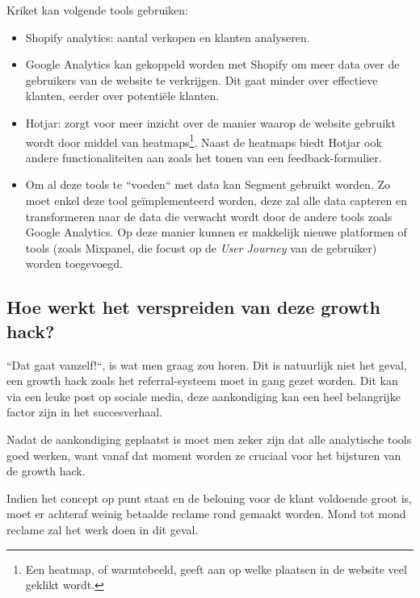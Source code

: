 Kriket kan volgende tools gebruiken:
\begin{itemize}
	\item Shopify analytics: aantal verkopen en klanten analyseren.
	\item Google Analytics kan gekoppeld worden met Shopify om meer data over de gebruikers van de website te verkrijgen. Dit gaat minder over effectieve klanten, eerder over potentiële klanten.
	\item Hotjar: zorgt voor meer inzicht over de manier waarop de website gebruikt wordt door middel van heatmaps\footnote{Een heatmap, of warmtebeeld, geeft aan op welke plaatsen in de website veel geklikt wordt.}. Naast de heatmaps biedt Hotjar ook andere functionaliteiten aan zoals het tonen van een feedback-formulier.
	\item Om al deze tools te ``voeden`` met data kan Segment gebruikt worden. Zo moet enkel deze tool geïmplementeerd worden, deze zal alle data capteren en transformeren naar de data die verwacht wordt door de andere tools zoals Google Analytics. Op deze manier kunnen er makkelijk nieuwe platformen of tools (zoals Mixpanel, die focust op de \emph{User Journey} van de gebruiker) worden toegevoegd.
\end{itemize}

\subsection{Hoe werkt het verspreiden van deze growth hack?}
\label{subsec:growth-hack-verspreiden}
``Dat gaat vanzelf!``, is wat men graag zou horen. Dit is natuurlijk niet het geval, een growth hack zoals het referral-systeem moet in gang gezet worden. Dit kan via een leuke post op sociale media, deze aankondiging kan een heel belangrijke factor zijn in het succesverhaal. 

Nadat de aankondiging geplaatst is moet men zeker zijn dat alle analytische tools goed werken, want vanaf dat moment worden ze cruciaal voor het bijsturen van de growth hack.

Indien het concept op punt staat en de beloning voor de klant voldoende groot is, moet er achteraf weinig betaalde reclame rond gemaakt worden. Mond tot mond reclame zal het werk doen in dit geval. 

